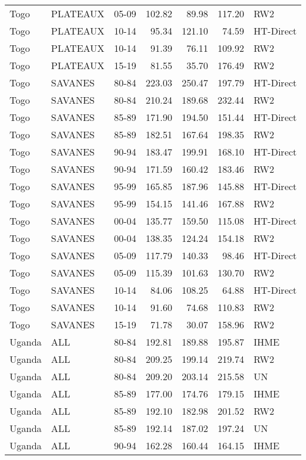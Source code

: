 \begin{longtable}{lllrrrl}
  Togo & PLATEAUX & 05-09 & 102.82 & 89.98 & 117.20 & RW2 \\ 
  Togo & PLATEAUX & 10-14 & 95.34 & 121.10 & 74.59 & HT-Direct \\ 
  Togo & PLATEAUX & 10-14 & 91.39 & 76.11 & 109.92 & RW2 \\ 
  Togo & PLATEAUX & 15-19 & 81.55 & 35.70 & 176.49 & RW2 \\ 
  Togo & SAVANES & 80-84 & 223.03 & 250.47 & 197.79 & HT-Direct \\ 
  Togo & SAVANES & 80-84 & 210.24 & 189.68 & 232.44 & RW2 \\ 
  Togo & SAVANES & 85-89 & 171.90 & 194.50 & 151.44 & HT-Direct \\ 
  Togo & SAVANES & 85-89 & 182.51 & 167.64 & 198.35 & RW2 \\ 
  Togo & SAVANES & 90-94 & 183.47 & 199.91 & 168.10 & HT-Direct \\ 
  Togo & SAVANES & 90-94 & 171.59 & 160.42 & 183.46 & RW2 \\ 
  Togo & SAVANES & 95-99 & 165.85 & 187.96 & 145.88 & HT-Direct \\ 
  Togo & SAVANES & 95-99 & 154.15 & 141.46 & 167.88 & RW2 \\ 
  Togo & SAVANES & 00-04 & 135.77 & 159.50 & 115.08 & HT-Direct \\ 
  Togo & SAVANES & 00-04 & 138.35 & 124.24 & 154.18 & RW2 \\ 
  Togo & SAVANES & 05-09 & 117.79 & 140.33 & 98.46 & HT-Direct \\ 
  Togo & SAVANES & 05-09 & 115.39 & 101.63 & 130.70 & RW2 \\ 
  Togo & SAVANES & 10-14 & 84.06 & 108.25 & 64.88 & HT-Direct \\ 
  Togo & SAVANES & 10-14 & 91.60 & 74.68 & 110.83 & RW2 \\ 
  Togo & SAVANES & 15-19 & 71.78 & 30.07 & 158.96 & RW2 \\ 
  Uganda & ALL & 80-84 & 192.81 & 189.88 & 195.87 & IHME \\ 
  Uganda & ALL & 80-84 & 209.25 & 199.14 & 219.74 & RW2 \\ 
  Uganda & ALL & 80-84 & 209.20 & 203.14 & 215.58 & UN \\ 
  Uganda & ALL & 85-89 & 177.00 & 174.76 & 179.15 & IHME \\ 
  Uganda & ALL & 85-89 & 192.10 & 182.98 & 201.52 & RW2 \\ 
  Uganda & ALL & 85-89 & 192.14 & 187.02 & 197.24 & UN \\ 
  Uganda & ALL & 90-94 & 162.28 & 160.44 & 164.15 & IHME \\ 

\end{longtable}
